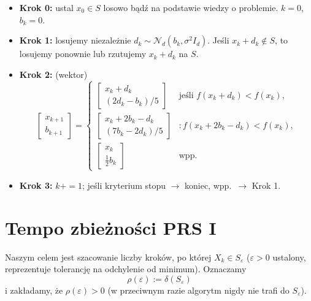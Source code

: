 \documentclass[dvipsnames]{book}
\begin{document}
\begin{algorytm}
\begin{itemize}[topsep=0pt,itemsep=0pt]
  \item \textbf{Krok 0:} ustal $x_0 \in S$ losowo bądź na podstawie wiedzy o
  problemie. $k = 0$, $b_k = 0$.
  \item \textbf{Krok 1:} losujemy niezależnie $d_k \sim \mathcal{N}_d(b_k, \sigma^2 I_d)$.
  Jeśli $x_k + d_k \notin S$, to losujemy ponownie lub rzutujemy $x_k + d_k$ na $S$.
  \item \textbf{Krok 2:} (wektor)
  \[
    \begin{bmatrix} x_{k+1} \\ b_{k+1} \end{bmatrix} =
    \begin{cases}
      \begin{bmatrix} x_k + d_k \\[1mm] (2d_k - b_k)/5 \end{bmatrix}
        & \text{jeśli } f(x_k + d_k) < f(x_k), \\[8mm]
      \begin{bmatrix} x_k + 2b_k - d_k \\[1mm] (7b_k - 2d_k)/5 \end{bmatrix}
        & : f(x_k + 2b_k - d_k) < f(x_k), \\[8mm]
      \begin{bmatrix} x_k \\[1mm] \tfrac{1}{2} b_k \end{bmatrix}
        & \text{wpp.}
    \end{cases}
  \]
  \item \textbf{Krok 3:} $k \mathrel{{+}{=}} 1$; jeśli kryterium stopu
  $\longrightarrow$ koniec, wpp.\ $\longrightarrow$ Krok 1.
\end{itemize}
\end{algorytm}

\hrulefill

\section*{Tempo zbieżności PRS I}

Naszym celem jest szacowanie liczby kroków, po której $X_k \in S_\varepsilon$
($\varepsilon > 0$ ustalony, reprezentuje tolerancję na odchylenie od minimum).
Oznaczamy
\[
  \rho(\varepsilon) := \delta(S_\varepsilon)
\]
i zakładamy, że $\rho(\varepsilon) > 0$ (w przeciwnym razie algorytm nigdy nie
trafi do $S_\varepsilon$).
\end{document}
